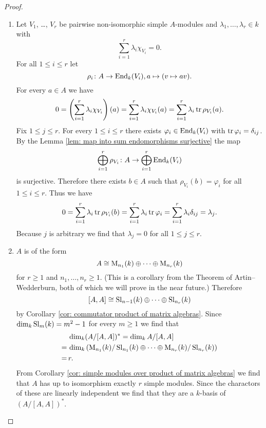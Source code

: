 \begin{proof}
 \begin{enumerate}[label=\emph{\alph*)},leftmargin=*]
  \item
   Let $V_1$, \dots, $V_r$ be pairwise non-isomorphic simple $A$-modules and $\lambda_1, \dotsc, \lambda_r \in k$ with
   \[
    \sum_{i=1}^r \lambda_i \chi_{V_i} = 0.
   \]
   For all $1 \leq i \leq r$ let
   \[
    \rho_i \colon A \to \operatorname{End}_k(V_i), a \mapsto (v \mapsto av).
   \]
   For every $a \in A$ we have
   \[
    0
    = \left( \sum_{i=1}^r \lambda_i \chi_{V_i} \right)(a)
    = \sum_{i=1}^r \lambda_i \chi_{V_i}(a)
    = \sum_{i=1}^r \lambda_i \operatorname{tr} \rho_{V_i}(a).
   \]
   Fix $1 \leq j \leq r$. For every $1 \leq i \leq r$ there exists $\varphi_i \in \operatorname{End}_k(V_i)$ with $\operatorname{tr} \varphi_i = \delta_{ij}$. By the Lemma \ref{lem: map into sum endomorphisms surjective} the map
   \[
    \bigoplus_{i=1}^r \rho_{V_i} \colon A \to \bigoplus_{i=1}^r \operatorname{End}_k(V_i)
   \]
   is surjective. Therefore there exists $b \in A$ such that $\rho_{V_i}(b) = \varphi_i$ for all $1 \leq i \leq r$. Thus we have
   \[
    0
    = \sum_{i=1}^r \lambda_i \operatorname{tr} \rho_{V_i}(b)
    = \sum_{i=1}^r \lambda_i \operatorname{tr} \varphi_i
    = \sum_{i=1}^r \lambda_i \delta_{ij}
    = \lambda_j.
   \]
   Because $j$ is arbitrary we find that $\lambda_j = 0$ for all $1 \leq j \leq r$.
  \item
   $A$ is of the form 
   \[
    A \cong \operatorname{M}_{n_1}(k) \oplus \dotsb \oplus \operatorname{M}_{n_r}(k)
   \]
   for $r \geq 1$ and $n_1, \dotsc, n_r \geq 1$. (This is a corollary from the Theorem of Artin--Wedderburn, both of which we will prove in the near future.) Therefore
   \[
    [A,A] \cong \operatorname{Sl}_{n-1}(k) \oplus \dotsb \oplus \operatorname{Sl}_{n_r}(k)
   \]
   by Corollary \ref{cor: commutator product of matrix algebras}. Since $\dim_k \operatorname{Sl}_m(k) = m^2 - 1$ for every $m \geq 1$ we find that
   \begin{align*}
     &\, \dim_k (A/[A,A])^*
    =    \dim_k A/[A,A] \\
    =&\, \dim_k\left( \operatorname{M}_{n_1}(k)/\operatorname{Sl}_{n_1}(k) \oplus \dotsb \oplus \operatorname{M}_{n_r}(k)/\operatorname{Sl}_{n_r}(k) \right) \\
    =&\, r.
   \end{align*}
   From Corollary \ref{cor: simple modules over product of matrix algebras} we find that $A$ has up to isomorphism exactly $r$ simple modules. Since the charactors of these are linearly independent we find that they are a $k$-basis of $(A/[A,A])^*$.
  \qedhere
 \end{enumerate}
\end{proof}



